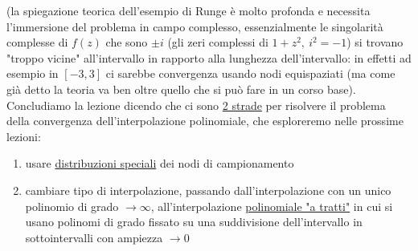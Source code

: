 \documentclass[12pt]{article}
\begin{document}
(la spiegazione teorica dell'esempio di Runge è molto profonda e necessita l'immersione del problema in campo complesso, essenzialmente le singolarità complesse di $f(z)$ che sono $\pm i$ (gli zeri complessi di $1+z^2, \ i^2 = -1$) si trovano "troppo vicine" all'intervallo in rapporto alla lunghezza dell'intervallo: in effetti ad esempio in $[-3,3]$ ci sarebbe convergenza usando nodi equispaziati (ma come già detto la teoria va ben oltre quello che si può fare in un corso base).\\
Concludiamo la lezione dicendo che ci sono \underline{2 strade} per risolvere
il problema della convergenza dell'interpolazione polinomiale, che esploreremo nelle prossime lezioni:
\begin{enumerate}
    \item usare \underline{distribuzioni speciali} dei nodi di campionamento
    \item cambiare tipo di interpolazione, passando dall'interpolazione con un unico polinomio di grado $\to \infty$, all'interpolazione \underline{polinomiale "a tratti"} in cui si usano polinomi di grado fissato su una suddivisione dell'intervallo in sottointervalli con ampiezza $\to 0$
\end{enumerate}
\end{document}
